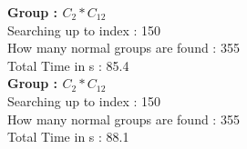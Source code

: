 \textbf{Group : $C_2*C_{12}$}\\
Searching up to index : 150\\
How many normal groups are found : 355\\
Total Time in s : 85.4\\
\textbf{Group : $C_2*C_{12}$}\\
Searching up to index : 150\\
How many normal groups are found : 355\\
Total Time in s : 88.1\\
